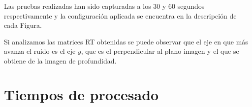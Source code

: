 Las pruebas realizadas han sido capturadas a los 30 y 60 segundos respectivamente y la configuración aplicada se encuentra en la descripción de cada Figura.

Si analizamos las matrices RT obtenidas se puede observar que el eje en que más avanza el ruido es el eje $y$, que es el perpendicular al plano imagen y el que se obtiene de la imagen de profundidad.


\section{Tiempos de procesado}